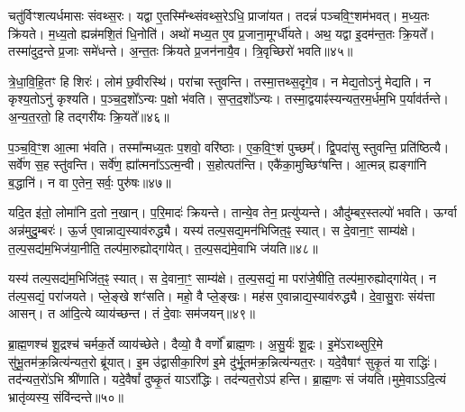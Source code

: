 चतु॑र्विꣳशत्यर्धमासः संवथ्स॒रः।
यद्वा ए॒तस्मि᳚न्थ्संवथ्स॒रेऽधि॒ प्राजा॑यत।
तदन्नं॑ पञ्चवि॒ꣳ॒शम॑भवत्।
म॒ध्य॒तः क्रि॑यते।
म॒ध्य॒तो ह्यन्न॑मशि॒तं धि॒नोति॑।
अथो॑ मध्य॒त ए॒व प्र॒जाना॒मूर्ग्धी॑यते।
अथ॒ यद्वा इ॒दम॑न्त॒तः क्रि॒यते᳚।
तस्मा॑दुद॒न्ते प्र॒जाः समे॑धन्ते।
अ॒न्त॒तः क्रि॑यते प्र॒जन॑नायै॒व।
त्रि॒वृच्छिरो॑ भवति॥४५॥\ip

त्रे॒धा॒वि॒हि॒तꣳ हि शिरः॑।
लोम॑ छ॒वीरस्थि॑।
परा॑चा स्तुवन्ति।
तस्मा॒त्तथ्स॒दृगे॒व।
न मेद्य॒तोऽनु॑ मेद्यति।
न कृश्य॒तोऽनु॑ कृश्यति।
प॒ञ्च॒द॒शो᳚\-ऽन्यः प॒क्षो भ॑वति।
स॒प्त॒द॒शो᳚\-ऽन्यः।
तस्मा॒द्वयाꣴ॑स्यन्यत॒रम॒र्धम॒भि प॒र्याव॑र्तन्ते।
अ॒न्य॒त॒रतो॒ हि तद्गरी॑यः क्रि॒यते᳚॥४६॥\ip

प॒ञ्च॒वि॒ꣳ॒श आ॒त्मा भ॑वति।
तस्मा᳚न्मध्य॒तः प॒शवो॒ वरि॑ष्ठाः।
ए॒क॒वि॒ꣳ॒शं पुच्छम्᳚।
द्वि॒पदा॑सु स्तुवन्ति॒ प्रति॑\-ष्ठित्यै।
सर्वे॑ण स॒ह स्तु॑वन्ति।
सर्वे॑ण॒ ह्या᳚त्मना᳚\-ऽऽत्म॒न्वी।
स॒होत्पत॑न्ति।
एकै॑का॒मुच्छिꣳ॑षन्ति।
आ॒त्मन्न् ह्यङ्गा॑नि ब॒द्धानि॑।
न वा ए॒तेन॒ सर्वः॒ पुरु॑षः॥४७॥\ip

यदि॒त इ॑तो॒ लोमा॑नि द॒तो न॒खान्।
प॒रि॒मादः॑ क्रियन्ते।
तान्ये॒व तेन॒ प्रत्यु॑प्यन्ते।
औदु॑म्बर॒स्तल्पो॑ भवति।
ऊर्ग्वा अन्न॑मुदु॒म्बरः॑।
ऊ॒र्ज ए॒वान्नाद्य॒स्या\-व॑\-रुद्ध्यै।
यस्य॑ तल्प॒सद्य॒मन॑भिजित॒ꣴ॒ स्यात्।
स दे॒वाना॒ꣳ॒ साम्य॑क्षे।
त॒ल्प॒सद्य॑म॒भिज॑या॒नीति॒ तल्प॑मा॒रुह्योद्गा॑येत्।
त॒ल्प॒सद्य॑मे॒वाभि ज॑यति॥४८॥\ip

यस्य॑ तल्प॒सद्य॑म॒भिजि॑त॒ꣴ॒ स्यात्।
स दे॒वाना॒ꣳ॒ साम्य॑क्षे।
त॒ल्प॒सद्यं॒ मा परा॑जे॒षीति॒ तल्प॑मा॒रुह्योद्गा॑येत्।
न त॑ल्प॒सद्यं॒ परा॑जयते।
प्ले॒ङ्खे शꣳ॑सति।
महो॒ वै प्ले॒ङ्खः।
मह॑स ए॒वान्नाद्य॒स्या\-व॑\-रुद्ध्यै।
दे॒वा॒सु॒राः संय॑त्ता आसन्।
त आ॑दि॒त्ये व्याय॑च्छन्त।
तं दे॒वाः सम॑जयन्॥४९॥\ip

ब्रा॒ह्म॒णश्च॑ शू॒द्रश्च॑ चर्मक॒र्ते व्याय॑च्छेते।
दैव्यो॒ वै वर्णो᳚ ब्राह्म॒णः।
अ॒सु॒र्यः॑ शू॒द्रः।
इ॒मे॑\-ऽराथ्सुरि॒मे सु॑भू॒तम॑क्र॒न्नित्य॑न्यत॒रो ब्रू॑यात्।
इ॒म उ॑द्वासीका॒रिण॑ इ॒मे दु॑र्भू॒तम॑क्र॒न्नित्य॑न्यत॒रः।
यदे॒वैषाꣳ॑ सुकृ॒तं या राद्धिः॑।
तद॑न्यत॒रो॑ऽभि श्री॑णाति।
यदे॒वैषां᳚ दुष्कृ॒तं याऽरा᳚द्धिः।
तद॑न्यत॒रोऽप॑ हन्ति।
ब्रा॒ह्म॒णः सं ज॑यति।मुमे॒वाऽऽदि॒त्यं भ्रातृ॑व्यस्य॒ संवि॑न्दन्ते॥५०॥\ip{}


\clearpage
{}
\setcounter{anuvakam}{0}

